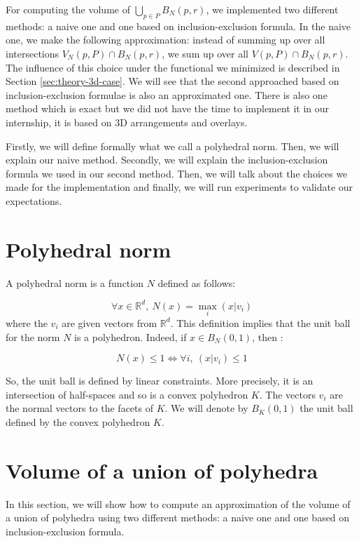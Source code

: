For computing the volume of $ \bigcup_{p \in P} B_N(p, r) $, we implemented two
different methods: a naive one and one based on inclusion-exclusion formula.  In
the naive one, we make the following approximation: instead of summing up over
all intersections $ V_N(p, P) \cap B_N(p, r) $, we sum up over all $ V(p, P)
\cap B_N(p, r) $. The influence of this choice under the functional we minimized
is described in Section \ref{sec:theory-3d-case}. We will see that the second
approached based on inclusion-exclusion formulae is also an approximated one.
There is also one method which is exact but we did not have the time to
implement it in our internship, it is based on 3D arrangements and overlays.

Firstly, we will define formally what we call a polyhedral norm. Then, we will
explain our naive method. Secondly, we will explain the inclusion-exclusion
formula we used in our second method. Then, we will talk about the choices we
made for the implementation and finally, we will run experiments to validate our
expectations.

\section{Polyhedral norm}
\label{sec:polyhedral-norm}
A polyhedral norm is a function $ N $ defined as follows:

\begin{equation}
    \forall x \in \mathbb{R}^d,~ N(x) = \max_{i} (x | v_i)
\end{equation}
where the $ v_i $ are given vectors from $ \mathbb{R}^d $. This definition
implies that the unit ball for the norm $ N $ is a polyhedron. Indeed, if $ x
\in B_N(0, 1) $, then :

$$ N(x) \leq 1 \Longleftrightarrow \forall i,~(x | v_i) \leq 1 $$

So, the unit ball is defined by linear constraints. More precisely, it is an intersection
of half-spaces and so is a convex polyhedron $ K $. The vectors $ v_i $ are the
normal vectors to the facets of $ K $. We will denote by $ B_K(0, 1) $ the unit
ball defined by the convex polyhedron $ K $.

\section{Volume of a union of polyhedra}

In this section, we will show how to compute an approximation of the volume of
a union of polyhedra using two different methods: a naive one and one based on
inclusion-exclusion formula.

